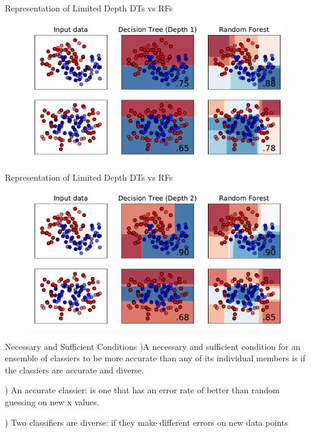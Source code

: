 \documentclass{beamer}
\begin{document}
\begin{frame}{Representation of Limited Depth DTs vs RFs}
  \begin{figure}
    \includegraphics[scale=0.7]{1-representation.pdf}
  \end{figure}
\end{frame}

\begin{frame}{Representation of Limited Depth DTs vs RFs}
  \begin{figure}
    \includegraphics[scale=0.7]{2-representation.pdf}
  \end{figure}
\end{frame}




\begin{frame}{Necessary and Sufficient Conditions}
  )A necessary and sufficient condition for an ensemble of classiers to be more
  accurate than any of its individual members is if the classiers are accurate and
  diverse.

  ) An accurate classier: \pause  is one that has an
  error rate of better than random guessing on new x values.

  ) Two classifiers are diverse: \pause  if they make different errors on new data points

\end{frame}
\end{document}
